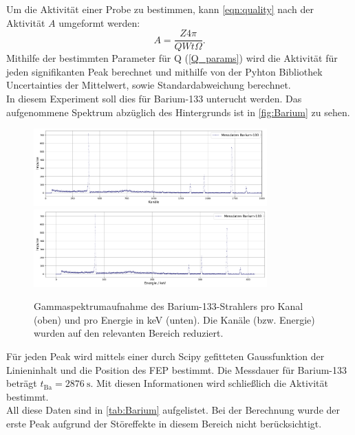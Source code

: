 Um die Aktivität einer Probe zu bestimmen, kann \autoref{eqn:quality} nach der Aktivität $A$ umgeformt werden:
\begin{equation}
    \label{eqn:Aktivitaet}
    A = \frac{Z 4 \pi}{ Q W t \Omega}.
\end{equation}
Mithilfe der bestimmten Parameter für Q (\ref{Q_params}) wird die Aktivität
für jeden signifikanten Peak berechnet und mithilfe von der Pyhton Bibliothek Uncertainties\cite{uncertainties} der Mittelwert, sowie Standardabweichung berechnet.\\
In diesem Experiment soll dies für Barium-133 unterucht werden. Das aufgenommene Spektrum abzüglich des Hintergrunds ist in \autoref{fig:Barium} zu sehen.
\begin{figure}
    \centering
    \includegraphics[width = 0.8\textwidth]{plots/barium_channel.pdf}
    \includegraphics[width = 0.8\textwidth]{plots/barium_energy.pdf}
    \caption{Gammaspektrumaufnahme des Barium-133-Strahlers pro Kanal (oben) und pro Energie in keV (unten). Die Kanäle (bzw. Energie) wurden auf den relevanten Bereich reduziert.}
    \label{fig:Barium}
\end{figure}
Für jeden Peak wird mittels einer durch Scipy\cite{scipy} gefitteten Gaussfunktion der Linieninhalt und die Position des FEP bestimmt. Die Messdauer für Barium-133 beträgt
$t_{\mathrm{Ba}} = \qty{2876}{\second}$. Mit diesen Informationen wird schließlich die Aktivität bestimmt.\\
All diese Daten sind in \autoref{tab:Barium} aufgelistet. Bei der Berechnung wurde der erste Peak aufgrund der Störeffekte in diesem Bereich nicht berücksichtigt.

